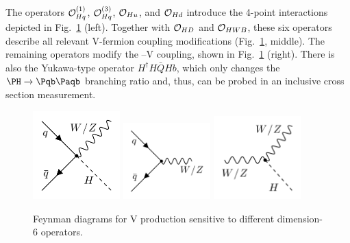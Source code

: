 \documentclass[a4paper,11pt]{article}
\newcommand{\Pb}{{{\Pqb}}\xspace}
\newcommand{\PAb}{{{{\Paqb}}}\xspace}
\renewcommand{\PV}{{{{V}}}\xspace}
\newcommand{\VH}{{{\PV}{\PH}}\xspace}
\begin{document}
The operators ${\cal O}^{(1)}_{Hq}$, ${\cal O}^{(3)}_{Hq}$, ${\cal O}_{Hu}$, and ${\cal O}_{Hd}$ introduce the 4-point interactions depicted in Fig.~\ref{fig:Feynman_digarams} (left). 
Together with ${\cal O}_{HD}$ and ${\cal O}_{HWB}$, these six operators describe all relevant \PV-fermion coupling modifications (Fig.~\ref{fig:Feynman_digarams}, middle). 
The remaining operators modify the \PH--\PV coupling, shown in Fig.~\ref{fig:Feynman_digarams} (right). 
There is also the Yukawa-type operator $H^\dagger H \bar{Q}H b$, which only changes the $\PH \to \Pb \PAb$ branching ratio and, thus, can be probed in an inclusive cross section measurement. 
\begin{figure}[hbtp]
\begin{center}
\includegraphics[width=0.3\textwidth]{Figures/New/LHE//qqVH.png}
\includegraphics[width=0.3\textwidth]{Figures/New/LHE//qqV.png}
\includegraphics[width=0.3\textwidth]{Figures/New/LHE//VVh.png}
\end{center}
\caption{
Feynman diagrams for \VH production sensitive to different dimension-6 operators.
}
\label{fig:Feynman_digarams}
\end{figure}
\end{document}
